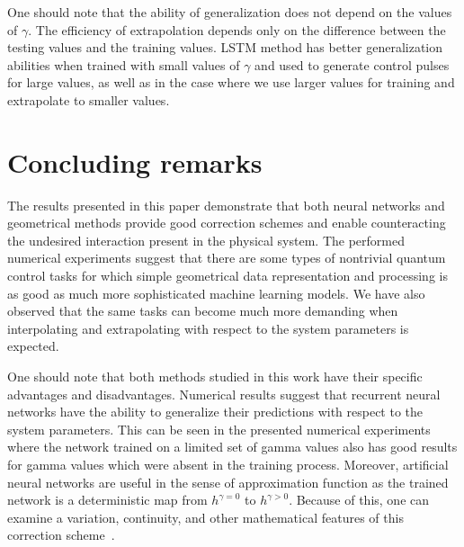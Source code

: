 \documentclass[aps,pra,showkeys,showpacs,notitlepage,superscriptaddress]{revtex4-1}
\newcommand{\1}{{\rm 1\hspace{-0.9mm}l}}
\newcommand{\NCP}{\ensuremath{h^{\gamma=0}}\xspace}
\newcommand{\DCP}{\ensuremath{h^{\gamma >0}}\xspace}
\begin{document}
One should note that the ability of generalization does not depend on the  values of $\gamma$. The efficiency of extrapolation depends only on the difference between the testing values and the training values.  LSTM method has better generalization abilities when trained with small values of $\gamma$ and used to generate control pulses for large values, as well as in the case where we use larger values for training and extrapolate to smaller values.
%

\section{Concluding remarks}\label{sec:fianl}


The results presented in this paper demonstrate that both neural networks and 
geometrical methods provide good correction schemes and 
enable counteracting the undesired interaction present in the physical system. 
The performed numerical experiments suggest that there are some types of nontrivial quantum 
control tasks for which simple geometrical data representation and processing 
is as good as much more sophisticated machine learning models. We have also observed that the 
same tasks can become much more demanding when interpolating and extrapolating 
with respect to the system parameters is expected.


One should note that both methods studied in this work have their specific 
advantages and
disadvantages. Numerical results suggest that recurrent neural networks have 
the ability to generalize their predictions with respect to the system  
parameters.
This can be seen in the presented numerical experiments where the network trained on a limited set of gamma values also has good results for gamma values which were absent in the training process. Moreover, artificial neural networks are useful in the sense of approximation function as the trained network is a deterministic map from \NCP to \DCP. Because of this, one can examine a variation, continuity, and other mathematical features of this correction scheme~\cite{ostaszewski18approximation}.
\end{document}
